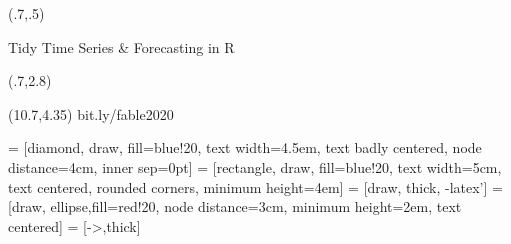 \usepackage{bm,booktabs,animate,ragged2e,multicol,microtype,hyperref}

\graphicspath{{../figs/}{figs/}}
\def\full#1{\vspace*{0.15cm}\centerline{\texttt{[image: \#1]}}}

\fontsize{13}{15}\sf
\usepackage[scale=0.85]{sourcecodepro}
\usepackage{fontawesome}

{
\begin{textblock}{7.5}(.7,.5)\fontsize{24}{26}\sf
{\color[RGB]{73,129,175}\raggedright{}\par Tidy Time Series \& Forecasting in R}
\end{textblock}
\begin{textblock}{7.5}(.7,2.8)
{\fontsize{15}{15}\sf\color{Orange}\raggedright{\insertauthor}}
\end{textblock}
\begin{textblock}{7.5}(10.7,4.35)
{\fontsize{9}{9}\sf\color{Orange}bit.ly/fable2020}
\end{textblock}
}



\def\E{\text{E}}
\def\V{\text{Var}}
\def\up#1{\raisebox{-0.3cm}{#1}}
\def\pred#1#2#3{\hat{#1}_{#2|#3}}
\def\damped{$_\text{d}$}
\def\h+{h_{m}^{+}}
\def\st#1{\rlap{#1}\textcolor{red}{\rule{1cm}{0.1cm}}}
\def\bY{\bm{y}}
\def\by{\bm{y}}
\def\bS{\bm{S}}
\def\bI{\text{\rm\textbf{I}}}
\def\bbeta{\bm{\beta}}
\def\bSigma{\bm{\Sigma}}
\def\bW{\bm{\Sigma}}
\def\Var{\text{Var}}
\def\var{\text{Var}}
\def\bOmega{\bm{\Omega}}
\def\bLambda{\bm{\Lambda}}
\let\mc\multicolumn
\def\hl{\color[RGB]{230, 172, 0}}



\usepackage{tikz}

\usetikzlibrary{trees,shapes,arrows,matrix}
 = [diamond, draw, fill=blue!20,
    text width=4.5em, text badly centered, node distance=4cm, inner sep=0pt]
 = [rectangle, draw, fill=blue!20,
    text width=5cm, text centered, rounded corners, minimum height=4em]
 = [draw, thick, -latex']
 = [draw, ellipse,fill=red!20, node distance=3cm,
    minimum height=2em, text centered]
 = [->,thick]
